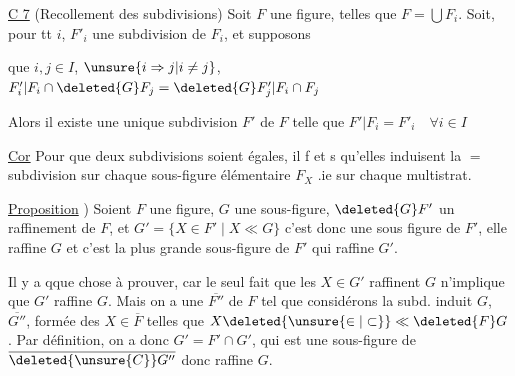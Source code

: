 
\uline{C 7} (Recollement des subdivisions) Soit $F$ une figure,    telles que $F=\bigcup F_i$. Soit, pour tt $i$, $F'_i$ une subdivision de $F_i$, et supposons


que  $i,j\in I$, $\unsure{i\Rightarrow j|i\ne j}$, $F'_i|F_i\cap\deleted{G}F_j=\deleted{G}F'_j|F_i\cap F_j$

Alors il existe une unique subdivision $F'$ de $F$ telle que $F'|F_i=F'_i\quad\forall i\in I$

\uline{Cor} Pour que deux subdivisions  soient égales, il f et s qu'elles induisent la $=$ subdivision sur chaque sous-figure élémentaire $F_X$ .ie sur chaque multistrat.

 \uline{Proposition} ) Soient $F$ une figure, $G$ une sous-figure, $\deleted{G}F'$ un raffinement de $F$, et $G'=\{X\in F'\mid X\ll G\}$ c'est donc une sous figure de $F'$,  elle raffine $G$ et c'est  la plus grande sous-figure de $F'$ qui raffine $G'$.



 Il y a qque chose à prouver, car le seul fait que les $X\in G'$ raffinent $G$ n'implique  que $G'$ raffine $G$. Mais on a une   $\overline{F''}$ de $F$ tel que  considérons la subd. induit  $G$, $\overline{G''}$, formée des $X\in\overline{F}$ telles que $X\deleted{\unsure{\in|\subset}}\ll \deleted{F}G$.  Par définition, on a donc $G'=F'\cap G'$, qui est  une sous-figure de $\overline{\deleted{\unsure{C}}G''}$ donc raffine $G$.

